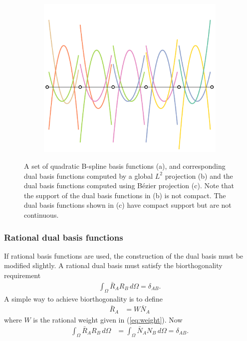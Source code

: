 \documentclass{article}
\begin{document}
\begin{figure}
\begin{subfigure}[b]{0.32\linewidth}
        \caption{}
    \end{subfigure}
    \begin{subfigure}[b]{0.32\linewidth}        %
        \centering
        \includegraphics[width=\linewidth]{dualbasis}
        \caption{}
    \end{subfigure}
    \caption{A set of quadratic B-spline basis functions (a), and corresponding dual basis functions computed by a global $L^2$ projection (b) and the dual basis functions computed using B\'ezier projection (c). Note that the support of the dual basis functions in (b) is not compact. The dual basis functions shown in (c) have compact support but are not continuous.}
    \label{fig:dualbasis}
\end{figure}

\subsubsection{Rational dual basis functions}
If rational basis functions are used, the construction of the dual basis must be modified slightly. A rational dual basis must satisfy the biorthogonality requirement
\begin{align}
  \int_{\Omega} \bar{R}_A R_B \, d\Omega= \delta_{AB}.
\end{align}
A simple way to achieve biorthogonality is to define
\begin{align}
  \bar{R}_A &= W \bar{N}_A
\end{align}
where $W$ is the rational weight given in (\ref{eq:weight}). Now
\begin{align}
  \int_{\Omega} \bar{R}_A R_B \, d\Omega &= \int_{\Omega} \bar{N}_A N_B \, d\Omega = \delta_{AB}.
  \end{align}
\end{document}
